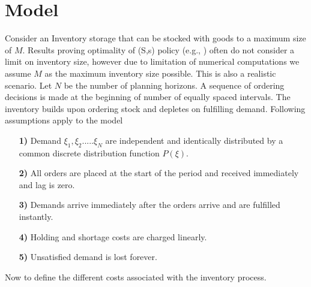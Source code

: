 \documentclass[11pt,a4paper,oneside]{report}
\begin{document}
\section{Model}
Consider an Inventory storage that can be stocked with goods to a maximum size of $M$. Results proving optimality of (S,s) policy (e.g., \citep{scarf1959optimality}) often do not consider a limit on inventory size, however due to limitation of numerical computations we assume $M$ as the maximum inventory size possible.  This is also a realistic scenario. Let $N$ be the number of planning horizons. A sequence of ordering decisions is made at the beginning of number of equally spaced intervals. The inventory builds upon ordering stock and depletes on fulfilling demand. Following assumptions apply to the model 
\begin{enumerate}
\item[\textbf{1)}] Demand $\xi_1, \xi_2.....\xi_N$ are independent and identically distributed by a common discrete distribution function $P(\xi)$.
\item[\textbf{2)}] All orders are placed at the start of the period and received immediately and lag is zero.
\item[\textbf{3)}] Demands arrive immediately after the orders arrive and are fulfilled instantly.
\item[\textbf{4)}] Holding and shortage costs are charged linearly.
\item[\textbf{5)}] Unsatisfied demand is lost forever.
\end{enumerate}
\noindent Now to define the different costs associated with the inventory process.
\end{document}
